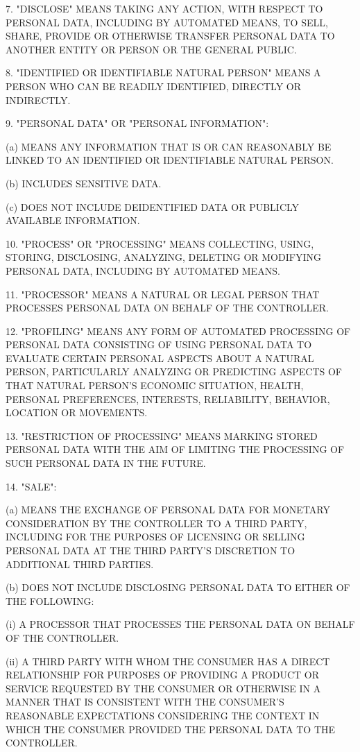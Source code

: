 7. "DISCLOSE" MEANS TAKING ANY ACTION, WITH RESPECT TO PERSONAL DATA, INCLUDING BY AUTOMATED MEANS, TO SELL, SHARE, PROVIDE OR OTHERWISE TRANSFER PERSONAL DATA TO ANOTHER ENTITY OR PERSON OR THE GENERAL PUBLIC.

8. "IDENTIFIED OR IDENTIFIABLE NATURAL PERSON" MEANS A PERSON WHO CAN BE READILY IDENTIFIED, DIRECTLY OR INDIRECTLY.

9. "PERSONAL DATA" OR "PERSONAL INFORMATION":

(a) MEANS ANY INFORMATION THAT IS OR CAN REASONABLY BE LINKED TO AN IDENTIFIED OR IDENTIFIABLE NATURAL PERSON.

(b) INCLUDES SENSITIVE DATA.

(c) DOES NOT INCLUDE DEIDENTIFIED DATA OR PUBLICLY AVAILABLE INFORMATION.

10. "PROCESS" OR "PROCESSING" MEANS COLLECTING, USING, STORING, DISCLOSING, ANALYZING, DELETING OR MODIFYING PERSONAL DATA, INCLUDING BY AUTOMATED MEANS.

11. "PROCESSOR" MEANS A NATURAL OR LEGAL PERSON THAT PROCESSES PERSONAL DATA ON BEHALF OF THE CONTROLLER.

12. "PROFILING" MEANS ANY FORM OF AUTOMATED PROCESSING OF PERSONAL DATA CONSISTING OF USING PERSONAL DATA TO EVALUATE CERTAIN PERSONAL ASPECTS ABOUT A NATURAL PERSON, PARTICULARLY ANALYZING OR PREDICTING ASPECTS OF THAT NATURAL PERSON'S ECONOMIC SITUATION, HEALTH, PERSONAL PREFERENCES, INTERESTS, RELIABILITY, BEHAVIOR, LOCATION OR MOVEMENTS.

13. "RESTRICTION OF PROCESSING" MEANS MARKING STORED PERSONAL DATA WITH THE AIM OF LIMITING THE PROCESSING OF SUCH PERSONAL DATA IN THE FUTURE.

14. "SALE":

(a) MEANS THE EXCHANGE OF PERSONAL DATA FOR MONETARY CONSIDERATION BY THE CONTROLLER TO A THIRD PARTY, INCLUDING FOR THE PURPOSES OF LICENSING OR SELLING PERSONAL DATA AT THE THIRD PARTY'S DISCRETION TO ADDITIONAL THIRD PARTIES.

(b) DOES NOT INCLUDE DISCLOSING PERSONAL DATA TO EITHER OF THE FOLLOWING:

(i) A PROCESSOR THAT PROCESSES THE PERSONAL DATA ON BEHALF OF THE CONTROLLER.

(ii) A THIRD PARTY WITH WHOM THE CONSUMER HAS A DIRECT RELATIONSHIP FOR PURPOSES OF PROVIDING A PRODUCT OR SERVICE REQUESTED BY THE CONSUMER OR OTHERWISE IN A MANNER THAT IS CONSISTENT WITH THE CONSUMER'S REASONABLE EXPECTATIONS CONSIDERING THE CONTEXT IN WHICH THE CONSUMER PROVIDED THE PERSONAL DATA TO THE CONTROLLER.

